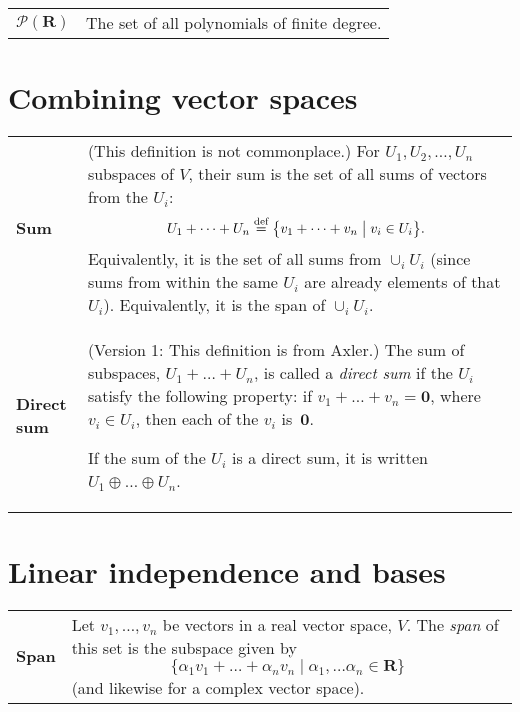 \documentclass[10pt, a4paper, landscape]{article}
\newcommand{\defn}[1]{\textbf{#1}}
\newcommand{\isdef}{\stackrel{\text{def}}{=}}
\newcommand{\set}[1]{\mathbold{#1}}
\begin{document}
\begin{multicols*}{3}
\begin{tabularx}{\columnwidth}{@{}l>{\raggedright\arraybackslash}X@{}}
  $\mathcal{P}(\set{R})$ & The set of all polynomials of finite degree.

\end{tabularx}


\section*{Combining vector spaces}
\begin{tabularx}{\columnwidth}{@{}l>{\raggedright\arraybackslash}X@{}}
  \toprule
  
  \defn{Sum} & (This definition is not commonplace.) For $U_1, U_2,
  \dotsc, U_n$ subspaces of $V$, their sum is the set of all sums of vectors from the $U_i$:
  \begin{equation*}
    U_1+\dots +U_n \isdef \bigl\{ v_1 + \dots + v_n \bigm\vert v_i \in U_i \bigr\}.
  \end{equation*}
  Equivalently, it is the set of all sums from $\cup_i U_i$ (since sums
  from within the same $U_i$ are already elements of that
  $U_i$). Equivalently, it is the span of $\cup_i U_i$. \\
  
  \defn{Direct sum} & (Version 1: This definition is from Axler.) The
  sum of subspaces, $U_1+\dots + U_n$, is called a \emph{direct sum} if
  the $U_i$ satisfy the following property: if $v_1+\dots +v_n =
  \mathbold{0}$, where $v_i\in U_i$, then each of the $v_i$
  is~$\mathbold{0}$. 

  If the sum of the $U_i$ is a direct sum, it is written $U_1\oplus \dots\oplus U_n$. \\
\end{tabularx}

\section*{Linear independence and bases}
\begin{tabularx}{\columnwidth}{@{}l>{\raggedright\arraybackslash}X@{}}
  \toprule

  \defn{Span} & Let $v_1, \dots, v_n$ be vectors in a real vector space,
  $V$. The \emph{span} of this set is the subspace given by
  \begin{equation*}
    \{ \alpha_1 v_1 +\dots + \alpha_n v_n \mid \alpha_1, \dots \alpha_n\in\set{R} \}
  \end{equation*}
  (and likewise for a complex vector space). \\


\end{tabularx}
\end{multicols*}
\end{document}
